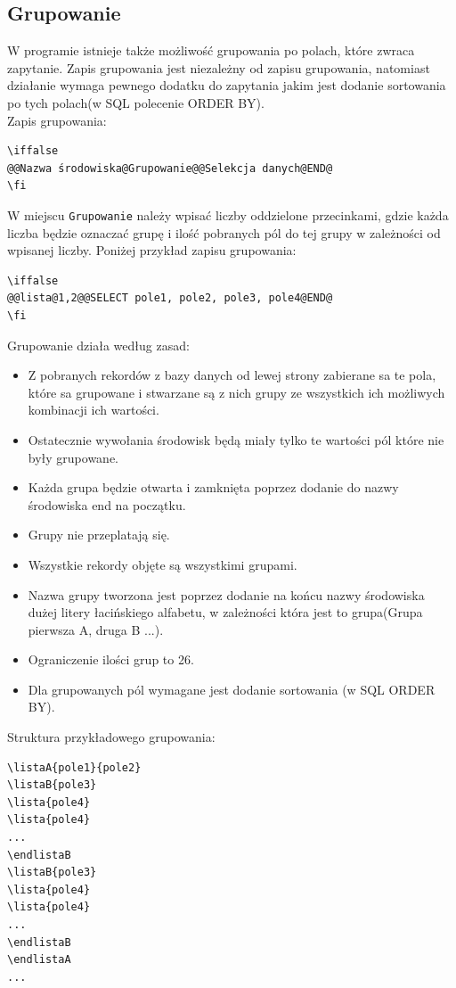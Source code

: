 \subsection{Grupowanie}
W programie istnieje także możliwość grupowania po polach, które zwraca zapytanie. Zapis grupowania jest niezależny od zapisu grupowania, natomiast działanie wymaga pewnego dodatku do zapytania jakim jest dodanie sortowania po tych polach(w SQL polecenie ORDER BY).\\
Zapis grupowania:
\begin{lstlisting}
\iffalse 
@@Nazwa środowiska@Grupowanie@@Selekcja danych@END@
\fi
\end{lstlisting}
W miejscu \texttt{Grupowanie} należy wpisać liczby oddzielone przecinkami, gdzie każda liczba będzie oznaczać grupę i ilość pobranych pól do tej grupy w zależności od wpisanej liczby. Poniżej przykład zapisu grupowania:
\begin{lstlisting}
\iffalse 
@@lista@1,2@@SELECT pole1, pole2, pole3, pole4@END@
\fi
\end{lstlisting}
\par 
Grupowanie działa według zasad:
\begin{itemize}
\item Z pobranych rekordów z bazy danych od lewej strony zabierane sa te pola, które sa grupowane i stwarzane są z nich grupy ze wszystkich ich możliwych kombinacji ich wartości. 
\item Ostatecznie wywołania środowisk będą miały tylko te wartości pól które nie były grupowane.
\item Każda grupa będzie otwarta i zamknięta poprzez dodanie do nazwy środowiska end na początku.
\item Grupy nie przeplatają się.
\item Wszystkie rekordy objęte są wszystkimi grupami.
\item Nazwa grupy tworzona jest poprzez dodanie na końcu nazwy środowiska dużej litery łacińskiego alfabetu, w zależności która jest to grupa(Grupa pierwsza A, druga B ...). 
\item Ograniczenie ilości grup to 26.
\item Dla grupowanych pól wymagane jest dodanie sortowania (w SQL ORDER BY).
\end{itemize}

Struktura przykładowego grupowania:
\begin{lstlisting}
\listaA{pole1}{pole2}
\listaB{pole3}
\lista{pole4}
\lista{pole4}
...
\endlistaB
\listaB{pole3}
\lista{pole4}
\lista{pole4}
...
\endlistaB
\endlistaA
...
\end{lstlisting}


